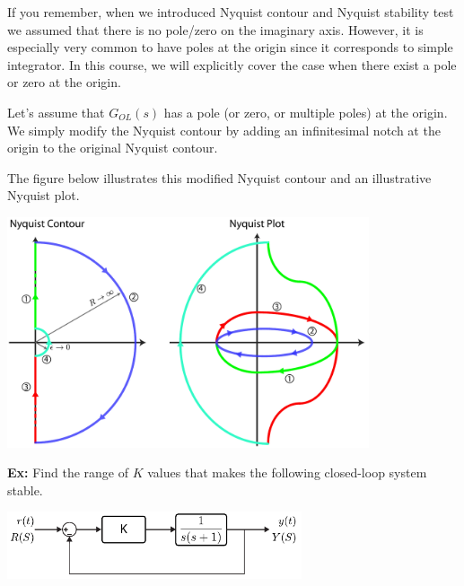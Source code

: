\documentclass[twoside]{article}
\begin{document}
If you remember, when we introduced Nyquist contour and Nyquist stability
test we assumed that there is no pole/zero on the imaginary axis. 
However, it is especially very common to have poles at the origin
since it corresponds to simple integrator. In this course, we will
explicitly cover the case when there exist a pole or zero at the
origin. 

Let's assume that $G_{OL}(s)$ has a pole (or zero, or multiple poles)
at the origin. We simply modify the Nyquist contour by adding an
infinitesimal notch at the origin to the original Nyquist contour. 

The figure below illustrates this modified Nyquist contour and 
an illustrative Nyquist plot. 

\vspace{12 pt}

  \begin{minipage}[h]{1\linewidth}
    \begin{center}
      \includegraphics[width=0.8\textwidth]{originnyq}
    \end{center}
  \end{minipage}

\vspace{6 pt}

\newpage

\textbf{Ex:} Find the range of $K$ values that makes the
following closed-loop system stable. 

\vspace{12 pt}

  \begin{minipage}[h]{1\linewidth}
    \begin{center}
      \includegraphics[width=0.65\textwidth]{ex5block}
    \end{center}
  \end{minipage}
\end{document}

